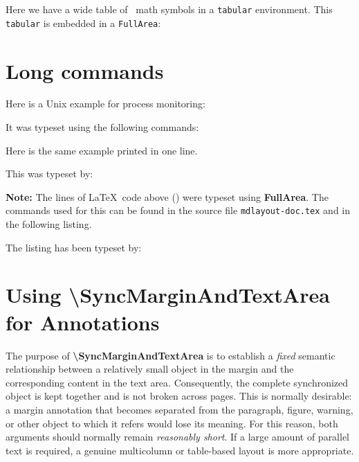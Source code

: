 \documentclass[
11pt,
a4paper,
oneside
]{scrbook}
\begin{document}
\begin{FullArea}
	Here we have a wide table of \LaTeXe\ math symbols in a \texttt{tabular} environment. This \texttt{tabular} is embedded in a \texttt{FullArea}:\\[2ex]
\begin{footnotesize}
\end{footnotesize}
\end{FullArea}

\section{Long commands}
Here is a Unix example for process monitoring:




It was typeset using the following commands:\\[1ex]








Here is the same example printed in one line.




This was typeset by:
\begin{FullArea}








\end{FullArea}
\noindent \textbf{Note:} The lines of \LaTeX\ code above () were typeset using \textbf{FullArea}. The commands used for this can be found in the source file \texttt{mdlayout-doc.tex} and in the following listing.




The listing has been typeset by:





\section{Using \textbackslash SyncMarginAndTextArea for Annotations}

The purpose of \textbf{\textbackslash SyncMarginAndTextArea} is to establish a \emph{fixed} semantic relationship
between a relatively small object in the margin and the corresponding
content in the text area.
Consequently, the complete synchronized object is kept together and is
not broken across pages. This is normally desirable: a margin annotation
that becomes separated from the paragraph, figure, warning, or other
object to which it refers would lose its meaning.
For this reason, both arguments should normally remain \emph{reasonably short}.
If a large amount of parallel text is required, a genuine multicolumn or
table-based layout is more appropriate.
\end{document}
